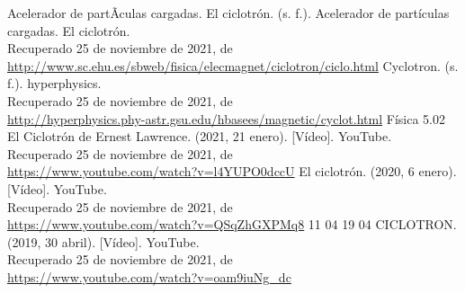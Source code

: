 \documentclass[12pt]{article}
\begin{document}
\begin{thebibliography}{11}
			 Acelerador de partÃ­culas cargadas. El ciclotrón. (s. f.). Acelerador de partículas cargadas. El ciclotrón. \\ 
							Recuperado 25 de noviembre de 2021, de \\ 
							\href{http://www.sc.ehu.es/sbweb/fisica/elecmagnet/ciclotron/ciclo.html}{http://www.sc.ehu.es/sbweb/fisica/elecmagnet/ciclotron/ciclo.html}
			 Cyclotron. (s. f.). hyperphysics. \\
			                    Recuperado 25 de noviembre de 2021, de \\ 
							\href{http://hyperphysics.phy-astr.gsu.edu/hbasees/magnetic/cyclot.html}{http://hyperphysics.phy-astr.gsu.edu/hbasees/magnetic/cyclot.html}
			 Física 5.02 El Ciclotrón de Ernest Lawrence. (2021, 21 enero). [Vídeo]. YouTube. \\ 
							Recuperado 25 de noviembre de 2021, de \\ 
							\href{https://www.youtube.com/watch?v=l4YUPO0dccU}{https://www.youtube.com/watch?v=l4YUPO0dccU}
			 El ciclotrón. (2020, 6 enero). [Vídeo]. YouTube. \\ 
							Recuperado 25 de noviembre de 2021, de \\ 
							\href{https://www.youtube.com/watch?v=QSqZhGXPMq8}{https://www.youtube.com/watch?v=QSqZhGXPMq8}
			 11 04 19 04 CICLOTRON. (2019, 30 abril). [Vídeo]. YouTube. \\
							 Recuperado 25 de noviembre de 2021, de \\  
							 \href{https://www.youtube.com/watch?v=oam9iuNg_dc}{https://www.youtube.com/watch?v=oam9iuNg\_dc}
		\end{thebibliography}
		
	
\end{document}
